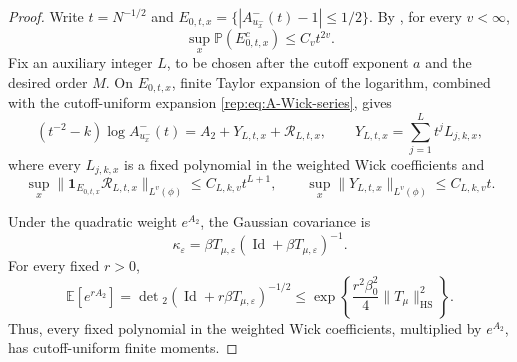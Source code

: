 \documentclass[11pt,reqno]{amsart}
\numberwithin{equation}{section}
\theoremstyle{plain}
\theoremstyle{definition}
\newcommand{\E}{\mathbb E}
\newcommand{\Id}{\operatorname{Id}}
\newcommand{\HS}{\mathrm{HS}}
\newcommand{\be}{\beta}
\newcommand{\vep}{\varepsilon}
\begin{document}
\begin{proof}
Write $t=N^{-1/2}$ and
$E_{0,t,x}=\{|A^-_{u_x^-}(t)-1|\le1/2\}$.  By , for every $v<\infty$,
\begin{equation}\label{rep:eq:bad-probability}
 \sup_x\mathbb P(E_{0,t,x}^c)\le C_vt^{2v}.
\end{equation}
Fix an auxiliary integer $L$, to be chosen after the cutoff exponent $a$ and the desired order $M$.  On $E_{0,t,x}$, finite Taylor expansion of the logarithm, combined with the cutoff-uniform expansion \eqref{rep:eq:A-Wick-series}, gives
\begin{equation}\label{rep:eq:log-overexpansion}
 (t^{-2}-k)\log A^-_{u_x^-}(t)
 =A_2+Y_{L,t,x}+\mathcal R_{L,t,x},
 \qquad
 Y_{L,t,x}=\sum_{j=1}^{L}t^jL_{j,k,x},
\end{equation}
where every $L_{j,k,x}$ is a fixed polynomial in the weighted Wick coefficients and
\begin{equation}\label{rep:eq:log-remainder-moment}
 \sup_x\|\mathbf1_{E_{0,t,x}}\mathcal R_{L,t,x}\|_{L^v(\phi)}
 \le C_{L,k,v}t^{L+1},
 \qquad
 \sup_x\|Y_{L,t,x}\|_{L^v(\phi)}\le C_{L,k,v}t.
\end{equation}

Under the quadratic weight $e^{A_2}$, the Gaussian covariance is
\begin{equation}\label{rep:eq:tilted-covariance}
 \kappa_{\vep}
 =\be T_{\mu,\vep}(\Id+\be T_{\mu,\vep})^{-1}.
\end{equation}
For every fixed $r>0$,
\begin{equation}\label{rep:eq:quadratic-exp-bound}
 \E[e^{rA_2}]
 =\det{}_2(\Id+r\be T_{\mu,\vep})^{-1/2}
 \le\exp\left\{\frac{r^2\be_0^2}{4}\|T_\mu\|_{\HS}^2\right\}.
\end{equation}
Thus, every fixed polynomial in the weighted Wick coefficients, multiplied by $e^{A_2}$, has cutoff-uniform finite moments.


\end{proof}
\end{document}
